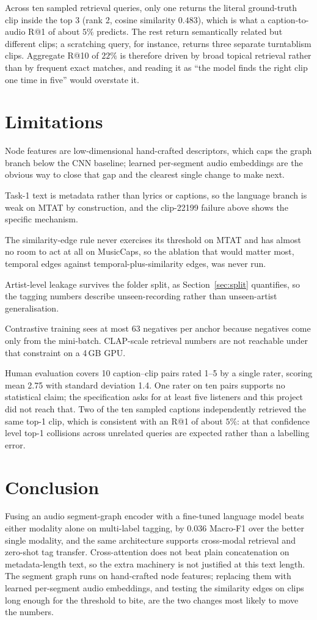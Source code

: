 \documentclass{article}
\begin{document}
Across ten sampled retrieval queries, only one returns the literal ground-truth
clip inside the top 3 (rank 2, cosine similarity $0.483$), which is what a
caption-to-audio R@1 of about $5\%$ predicts. The rest return semantically
related but different clips; a scratching query, for instance, returns three
separate turntablism clips. Aggregate R@10 of $22\%$ is therefore driven by
broad topical retrieval rather than by frequent exact matches, and reading it as
``the model finds the right clip one time in five'' would overstate it.

\section{Limitations}
Node features are low-dimensional hand-crafted descriptors, which caps the graph
branch below the CNN baseline; learned per-segment audio embeddings are the
obvious way to close that gap and the clearest single change to make next.

Task-1 text is metadata rather than lyrics or captions, so the language branch
is weak on MTAT by construction, and the clip-22199 failure above shows the
specific mechanism.

The similarity-edge rule never exercises its threshold on MTAT and has almost
no room to act at all on MusicCaps, so the ablation that would matter most,
temporal edges against temporal-plus-similarity edges, was never run.

Artist-level leakage survives the folder split, as Section~\ref{sec:split}
quantifies, so the tagging numbers describe unseen-recording rather than
unseen-artist generalisation.

Contrastive training sees at most 63 negatives per anchor because negatives come
only from the mini-batch. CLAP-scale retrieval numbers are not reachable under
that constraint on a 4\,GB GPU.

Human evaluation covers 10 caption--clip pairs rated 1--5 by a single rater,
scoring mean 2.75 with standard deviation 1.4. One rater on ten pairs supports
no statistical claim; the specification asks for at least five listeners and
this project did not reach that. Two of the ten sampled captions independently
retrieved the same top-1 clip, which is consistent with an R@1 of about $5\%$:
at that confidence level top-1 collisions across unrelated queries are expected
rather than a labelling error.

\section{Conclusion}
Fusing an audio segment-graph encoder with a fine-tuned language model beats
either modality alone on multi-label tagging, by $0.036$ Macro-F1 over the
better single modality, and the same architecture supports cross-modal
retrieval and zero-shot tag transfer. Cross-attention does not beat plain
concatenation on metadata-length text, so the extra machinery is not justified
at this text length. The segment graph runs on hand-crafted node features;
replacing them with learned per-segment audio embeddings, and testing the
similarity edges on clips long enough for the threshold to bite, are the two
changes most likely to move the numbers.



\end{document}
